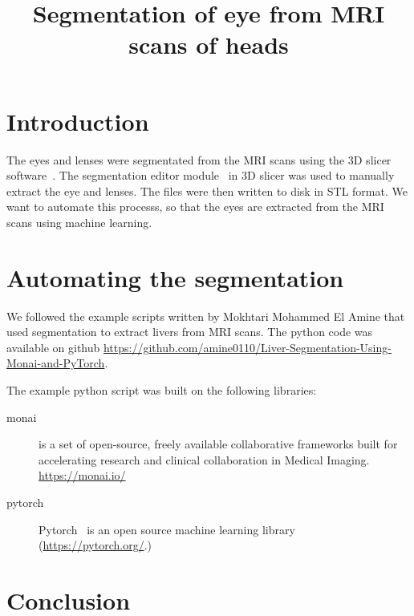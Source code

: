 \documentclass[12pt]{article}
\begin{document}
\title{Segmentation of eye from MRI scans of heads}
\date{}

\maketitle


\section{Introduction}

The eyes and lenses were segmentated from the MRI scans
using the 3D slicer software~\cite{kikinis20133d}.
The segmentation editor module~\cite{pinter2019polymorph}
in 3D slicer was used to manually
extract the eye and lenses.
The
files were then written to disk in STL format.
We want to automate this processs, so that the eyes are extracted from
the MRI scans using machine learning.


\section{Automating the segmentation}

We followed the example scripts written by
Mokhtari Mohammed El Amine that used segmentation to extract
livers from MRI scans. The python code was available
on github \url{https://github.com/amine0110/Liver-Segmentation-Using-Monai-and-PyTorch}.

The example python script was built on the following libraries:

\begin{description}

  \item[monai] is a set of open-source, freely available collaborative frameworks built for accelerating research and clinical collaboration in Medical Imaging.  \url{https://monai.io/}

\item[pytorch] Pytorch~\cite{paszke2019pytorch}
  is an open source machine learning library  (\url{https://pytorch.org/}.)
    
\end{description}

\section{Conclusion}



\end{document}
